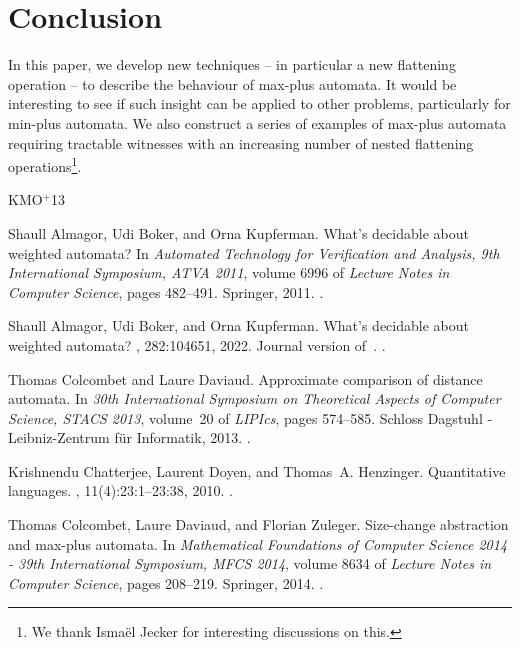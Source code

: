 \documentclass[10pt,a4paper]{amsart}
\theoremstyle{definition}
\numberwithin{equation}{section}
\theoremstyle{remark}
\theoremstyle{remark}
\begin{document}
\section{Conclusion}
In this paper, we develop new techniques -- in particular a new flattening operation -- to describe the behaviour of max-plus automata. It would be interesting to see if such insight can be applied to other problems, particularly for min-plus automata. We also construct a series of examples of max-plus automata requiring tractable witnesses with an increasing number of nested flattening operations\footnote{We thank Isma\"el Jecker for interesting discussions on this.}.


\newcommand{\etalchar}[1]{$^{#1}$}
\begin{thebibliography}{KMO{\etalchar{+}}13}

Shaull Almagor, Udi Boker, and Orna Kupferman.
\newblock What's decidable about weighted automata?
\newblock In {\em Automated Technology for Verification and Analysis, 9th
  International Symposium, {ATVA} 2011}, volume 6996 of {\em Lecture Notes in
  Computer Science}, pages 482--491. Springer, 2011.
\newblock \href {https://doi.org/10.1007/978-3-642-24372-1_37}
  {}.

Shaull Almagor, Udi Boker, and Orna Kupferman.
\newblock What's decidable about weighted automata?
, 282:104651, 2022.
\newblock Journal version of~\cite{AlmagorBK11}.
\newblock \href {https://doi.org/10.1016/j.ic.2020.104651}
  {}.

Thomas Colcombet and Laure Daviaud.
\newblock Approximate comparison of distance automata.
\newblock In {\em 30th International Symposium on Theoretical Aspects of
  Computer Science, {STACS} 2013}, volume~20 of {\em LIPIcs}, pages 574--585.
  Schloss Dagstuhl - Leibniz-Zentrum f{\"{u}}r Informatik, 2013.
\newblock \href {https://doi.org/10.4230/LIPIcs.STACS.2013.574}
  {}.

Krishnendu Chatterjee, Laurent Doyen, and Thomas~A. Henzinger.
\newblock Quantitative languages.
, 11(4):23:1--23:38, 2010.
\newblock \href {https://doi.org/10.1145/1805950.1805953}
  {}.

Thomas Colcombet, Laure Daviaud, and Florian Zuleger.
\newblock Size-change abstraction and max-plus automata.
\newblock In {\em Mathematical Foundations of Computer Science 2014 - 39th
  International Symposium, {MFCS} 2014}, volume 8634 of {\em Lecture Notes in
  Computer Science}, pages 208--219. Springer, 2014.
\newblock \href {https://doi.org/10.1007/978-3-662-44522-8_18}
  {}.


\end{thebibliography}
\end{document}
